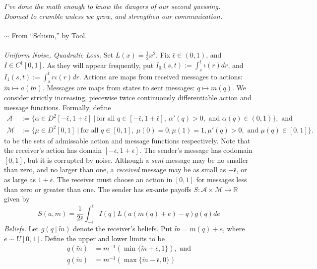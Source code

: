 \documentclass[12pt]{article}
\begin{document}
\noindent\textit{I've done the math enough to know the dangers of our second guessing.\\ Doomed to crumble unless we grow, and strengthen our communication.}\\ \\$\sim$ From ``Schism,'' by Tool. \\ \\
\noindent\textit{Uniform Noise, Quadratic Loss.} Set $L(x)=\frac{1}{2}x^2$. Fix $\bar{\epsilon}\in(0,1)$, and $I\in C^{1}[0,1]$. As they will appear frequently, put $I_{0}(s,t):=\int_{s}^{t}{\iota(r)dr}$, and $I_{1}(s,t):=\int_{s}^{t}{r\iota(r)dr}$. Actions are maps from received messages to actions: $\tilde{m}\mapsto a(\tilde{m})$. Messages are maps from states to sent messages: $q\mapsto m(q)$. We consider strictly increasing, piecewise twice continuously differentiable action and message functions. Formally, define
\begin{align}
\mathcal{A}&:=\{\alpha\in D^{2}[-\bar{\epsilon},1+\bar{\epsilon}]\:|\:\text{for all }q\in[-\bar{\epsilon},1+\bar{\epsilon}],\:\alpha'(q)>0,\text{ and }\alpha(q)\in(0,1)\},\text{ and}\\
\mathcal{M}&:=\{\mu\in D^{2}[0,1]\:|\:\text{for all }q\in[0,1],\:\mu(0)=0,\mu(1)=1,\mu'(q)>0,\text{ and }\mu(q)\in[0,1]\}.
\end{align}
to be the sets of admissable action and message functions respectively. Note that the receiver's action has domain $[-\bar{\epsilon},1+\bar{\epsilon}]$. The sender's message has codomain $[0,1]$, but it is corrupted by noise. Although a \textit{sent} message may be no smaller than zero, and no larger than one, a \textit{received} message may be as small as $-\bar{\epsilon}$, or as large as $1+\bar{\epsilon}$. The receiver must choose an action in $[0,1]$ for messages less than zero or greater than one. The sender has ex-ante payoffs $S:\mathcal{A}\times\mathcal{M}\rightarrow\mathbb{R}$ given by
\begin{equation}
S(a,m)=\frac{1}{2\bar{\epsilon}}\int_{-\bar{\epsilon}}^{\bar{\epsilon}}{I(q)L(a(m(q)+e)-q)g(q)de}
\end{equation}
\textit{Beliefs.} Let $g(q\:|\:\tilde{m})$ denote the receiver's beliefs. Put $\tilde{m}=m(q)+e$, where $e\sim U[0,1]$. Define the upper and lower limits to be 
\begin{align}
\overline{q}(\tilde{m})&=m^{-1}(\min\{\tilde{m}+\bar{\epsilon},1\}),\text{ and}\\
\underline{q}(\tilde{m})&=m^{-1}(\max\{\tilde{m}-\bar{\epsilon},0\})
\end{align} 
\end{document}
